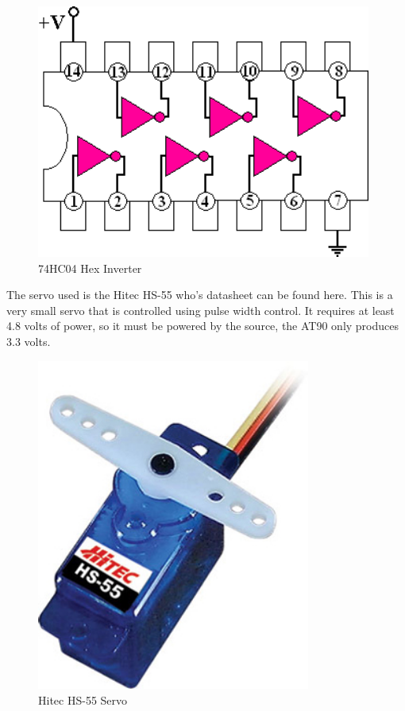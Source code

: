 \begin{figure}[h]
  \begin{center}
    \includegraphics[width=110mm]{imageSources/hexInverter.png}
  \end{center}
  \caption{74HC04 Hex Inverter} 
  \label{hexInverter}
\end{figure}

The servo used is the Hitec HS-55 who's datasheet can be found here. This is a very small servo that is controlled using pulse width control. It requires at least 4.8 volts of power, so it must be powered by the source, the AT90 only produces 3.3 volts.

\begin{figure}[h]
  \begin{center}
    \includegraphics[width=90mm]{imageSources/servo.png}
  \end{center}
  \caption{Hitec HS-55 Servo} 
  \label{servo}
\end{figure}


